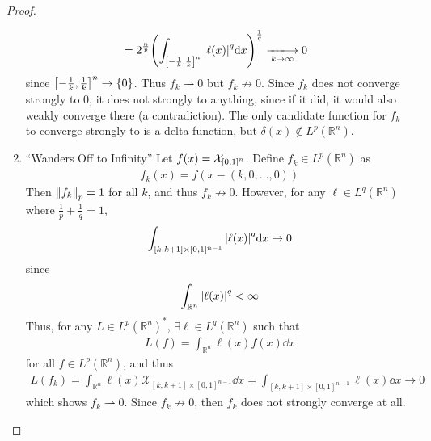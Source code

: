 \documentclass{article} %
\theoremstyle{plain}
\def\Rl{\mathbb{R}}
\numberwithin{equation}{section} %
\numberwithin{figure}{section} %
\numberwithin{table}{section} %
\begin{document}
\begin{proof}
\begin{enumerate}[ (a)]
\begin{align*}
                &= 2^{\frac{n}{p}} \qty(\int_{\qty[-\frac{1}{k}, \frac{1}{k}]^n} \abs{\ell(x)}^q \dd x)^{\frac{1}{q}}\xlongrightarrow[k\rightarrow \infty]{} 0
            \end{align*}
            since $\qty[-\frac{1}{k}, \frac{1}{k}]^n \rightarrow \{0\}$.  Thus $f_k \rightharpoonup 0$ but $f_k \not\rightarrow 0$.  Since $f_k$ does not converge strongly to $0$, it does not strongly to anything, since if it did, it would also weakly converge there (a contradiction).  The only candidate function for $f_k$ to converge strongly to is a delta function, but $\delta(x) \not\in L^p(\Rl^n)$.
        \item ``Wanders Off to Infinity''
            Let $f(x) = \mathcal{X}_{\qty[0,1]^n}$.  Define $f_k \in L^p(\Rl^n)$ as
            \begin{align*}
                f_k(x) = f(x - (k, 0, \dots, 0))
            \end{align*}
            Then $\norm{f_k}_p = 1$ for all $k$, and thus $f_k \not\rightarrow 0$.  However, for any $\ell \in L^q(\Rl^n)$ where $\frac{1}{p} + \frac{1}{q} = 1$, 
            \begin{align*}
                \int_{[k, k+1] \times [0,1]^{n-1}} \abs{\ell(x)}^q \dd x \rightarrow 0
            \end{align*}
            since
            \begin{align*}
                \int_{\Rl^n} \abs{\ell(x)}^q < \infty
            \end{align*}
            Thus, for any $L \in L^p(\Rl^n)^*$, $\exists \ell \in L^q(\Rl^n)$ such that
            \begin{align*}
                L(f) = \int_{\Rl^n} \ell(x) f(x) \dd x
            \end{align*}
            for all $f \in L^p(\Rl^n)$, and thus
            \begin{align*}
                L(f_k) = \int_{\Rl^n} \ell(x) \mathcal{X}_{[k, k+1]\times[0,1]^{n-1}} \dd x = \int_{[k,k+1] \times [0,1]^{n-1}}\ell(x)\dd x \rightarrow 0
            \end{align*}
            which shows $f_k \rightharpoonup 0$.  Since $f_k \not\rightarrow 0$, then $f_k$ does not strongly converge at all.
    \end{enumerate}
\end{proof}
\end{document}
